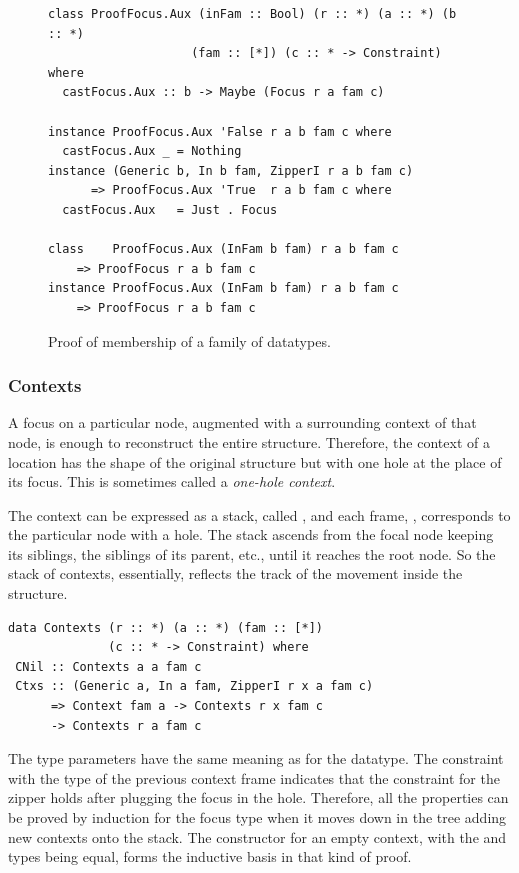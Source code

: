 \documentclass[sigplan,screen,review,anonymous]{acmart}
\begin{document}
\begin{figure}[t]
\begin{CenteredBox}
{\lset
\begin{lstlisting}[style=fancy]
class ProofFocus.Aux (inFam :: Bool) (r :: *) (a :: *) (b :: *)
                    (fam :: [*]) (c :: * -> Constraint) where
  castFocus.Aux :: b -> Maybe (Focus r a fam c)

instance ProofFocus.Aux 'False r a b fam c where
  castFocus.Aux _ = Nothing
instance (Generic b, In b fam, ZipperI r a b fam c)
      => ProofFocus.Aux 'True  r a b fam c where
  castFocus.Aux   = Just . Focus

class    ProofFocus.Aux (InFam b fam) r a b fam c
    => ProofFocus r a b fam c
instance ProofFocus.Aux (InFam b fam) r a b fam c
    => ProofFocus r a b fam c
\end{lstlisting}}
\end{CenteredBox}
\caption{Proof of membership of a family of datatypes.}
\label{fig:proof-in}
\end{figure}

\subsubsection{Contexts}

A focus on a particular node, augmented with a surrounding context of that node, is enough to reconstruct the entire structure. Therefore, the context of a location has the shape of the original structure but with one hole at the place of its focus. This is sometimes called a \emph{one-hole context}. 

The context can be expressed as a stack, called , and each frame, , corresponds to the particular node with a hole. The stack ascends from the focal node keeping its siblings, the siblings of its parent, etc., until it reaches the root node. So the stack of contexts, essentially, reflects the track of the movement inside the structure.
\begin{lstlisting}[style=fancy]
data Contexts (r :: *) (a :: *) (fam :: [*])
              (c :: * -> Constraint) where
 CNil :: Contexts a a fam c
 Ctxs :: (Generic a, In a fam, ZipperI r x a fam c)
      => Context fam a -> Contexts r x fam c
      -> Contexts r a fam c
\end{lstlisting}
The type parameters have the same meaning as for the  datatype. The  constraint with the type  of the previous context frame indicates that the constraint for the zipper holds after plugging the focus in the hole. Therefore, all the properties can be proved by induction for the focus type when it moves down in the tree adding new contexts onto the stack. The  constructor for an empty context, with the  and  types being equal, forms the inductive basis in that kind of proof. 
\end{document}
